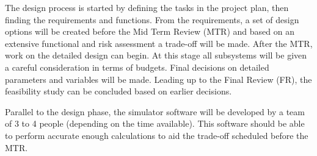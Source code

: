 The design process is started by defining the tasks in the project plan, then finding the requirements and functions. From the requirements, a set of design options will be created before the Mid Term Review (MTR) and based on an extensive functional and risk assessment a trade-off will be made. After the MTR, work on the detailed design can begin. At this stage all subsystems will be given a careful consideration in terms of budgets. Final decisions on detailed parameters and variables will be made. Leading up to the Final Review (FR), the feasibility study can be concluded based on earlier decisions.

Parallel to the design phase, the simulator software will be developed by a team of 3 to 4 people (depending on the time available). This software should be able to perform accurate enough calculations to aid the trade-off scheduled before the MTR.